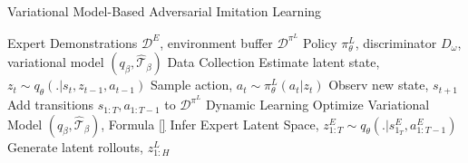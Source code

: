 \begin{algorithm}
    \caption{Variational Model-Based Adversarial Imitation Learning \cite{rafailov2021visual_ail}}
    \label{alg:vmail}
    \begin{algorithmic}
    \Require Expert Demonstrations $\mathcal{D}^{E}$, environment buffer $\mathcal{D}^{\pi^{L}}$
    \Require Policy $\pi^{L}_{\theta}$, discriminator $D_{\omega}$, variational model $(q_{\beta}, \hat{\mathcal{T}}_{\beta})$
            \Comment Data Collection
            \State Estimate latent state, $z_{t} \sim q_{\theta}(.|s_{t},z_{t-1},a_{t-1})$
            \State Sample action, $a_{t} \sim  \pi^{L}_{\theta}(a_{t}|z_{t})$
            \State Observ new state, $s_{t+1}$
        \EndFor
        \State Add transitions ${s_{1:T}, a_{1:T-1}}$ to $\mathcal{D}^{\pi^{L}}$
            \Comment Dynamic Learning
            \State Optimize Variational Model $(q_{\beta}, \hat{\mathcal{T}}_{\beta})$, Formula \ref{}
            \State Infer Expert Latent Space, $z_{1:T}^{E} \sim q_{\theta}(.| s_{1_T}^{E}, a_{1:T-1}^{E})$
            \State Generate latent rollouts, $z_{1:H}^{L} $ 
        \EndFor
    \EndFor
\end{algorithmic}
\end{algorithm}